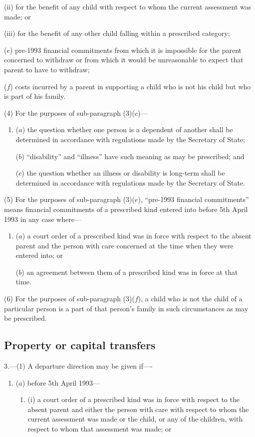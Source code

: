 \documentclass[a4paper]{article}
\begin{document}
{\begin{enumerate}
\begin{enumerate}
(ii)
for the benefit of any child with respect to whom the current assessment
was made; or

(iii) for the benefit of any other child falling within a prescribed category;
\end{enumerate}

($e$) pre-1993 financial commitments from which it is impossible for the parent
concerned to withdraw or from which it would be unreasonable to expect
that parent to have to withdraw;

($f$) costs incurred by a parent in supporting a child who is not his child but who
is part of his family.
\end{enumerate}

(4) For the purposes of sub-paragraph (3)($c$)---
\begin{enumerate}\item[]
($a$) the question whether one person is a dependent of another shall be determined
in accordance with regulations made by the Secretary of State;

($b$) “disability” and “illness” have such meaning as may be prescribed; and

($c$) the question whether an illness or disability is long-term shall be determined
in accordance with regulations made by the Secretary of State.
\end{enumerate}

(5)
For the purposes of sub-paragraph (3)($e$), “pre-1993 financial commitments” means financial commitments of a prescribed kind entered into before 5th April 1993 in any case where---
\begin{enumerate}\item[]
($a$) a court order of a prescribed kind was in force with respect to the absent
parent and the person with care concerned at the time when they were entered
into; or

($b$) an agreement between them of a prescribed kind was in force at that time.
\end{enumerate}

(6)
For the purposes of sub-paragraph (3)($f$), a child who is not the child of a particular person is a part of that person’s family in such circumstances as may be prescribed.

\subsection*{Property or capital transfers}

3.—(1) A departure direction may be given if----
\begin{enumerate}\item[]
($a$) before 5th April 1993---
\begin{enumerate}\item[]
(i) a court order of a prescribed kind was in force with respect to the absent
parent and either the person with care with respect to whom the current
assessment was made or the child, or any of the children, with respect to
whom that assessment was made; or


\end{enumerate}
\end{enumerate}}
\end{document}
